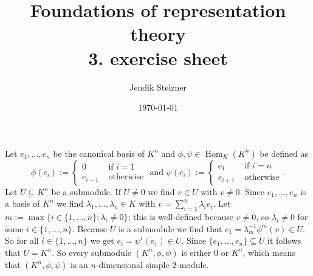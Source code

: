 \documentclass[a4paper,10pt]{article}
\title{Foundations of representation theory \\ 3. exercise sheet}
\author{Jendik Stelzner}
\date{\today}
\newcommand{\Hom}{\operatorname{Hom}}
\begin{document}
\maketitle





\section{}





\section{}





\section{}
Let $e_1, \ldots, e_n$ be the canonical basis of $K^n$ and $\phi, \psi \in \Hom_{K}(K^n)$ be defined as
\[
 \phi(e_i) :=
 \begin{cases}
  0       & \text{ if } i=1 \\
  e_{i-1} & \text{ otherwise}
 \end{cases}
 \text{ and }
 \psi(e_i) :=
 \begin{cases}
  e_1     & \text{ if } i=n \\
  e_{i+1} & \text{ otherwise}
 \end{cases}.
\]
Let $U \subseteq K^n$ be a submodule. If $U \neq 0$ we find $v \in U$ with $v \neq 0$. Since $e_1, \ldots, e_n$ is a basis of $K^n$ we find $\lambda_1, \ldots, \lambda_n \in K$ with $v = \sum_{i=1}^n \lambda_i e_i$. Let $m := \max \{i \in \{1, \ldots, n\} : \lambda_i \neq 0\}$; this is well-defined because $v \neq 0$, so $\lambda_i \neq 0$ for some $i \in \{1, \ldots, n\}$. Because $U$ is a submodule we find that $e_1 = \lambda_m^{-1} \phi^m(v) \in U$. So for all $i \in \{1, \ldots, n\}$ we get $e_i = \psi^i(e_1) \in U$. Since $\{e_1, \ldots, e_n\} \subseteq U$ it follows that $U = K^n$. So every submodule $(K^n, \phi, \psi)$ is either $0$ or $K^n$, which means that $(K^n,\phi,\psi)$ is an $n$-dimensional simple $2$-module.
\end{document}
